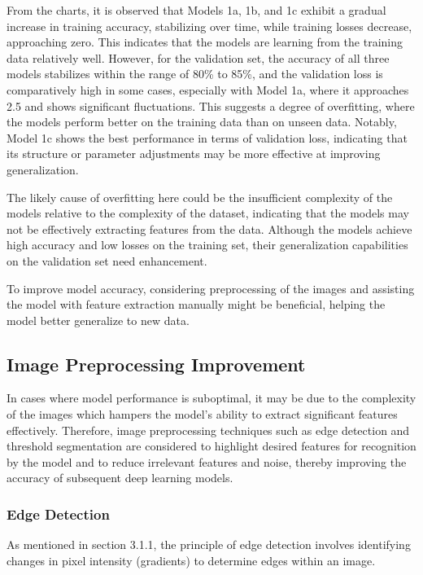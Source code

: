 From the charts, it is observed that Models 1a, 1b, and 1c exhibit a gradual increase in training accuracy, stabilizing over time, while training losses decrease, approaching zero. This indicates that the models are learning from the training data relatively well. However, for the validation set, the accuracy of all three models stabilizes within the range of 80\% to 85\%, and the validation loss is comparatively high in some cases, especially with Model 1a, where it approaches 2.5 and shows significant fluctuations. This suggests a degree of overfitting, where the models perform better on the training data than on unseen data. Notably, Model 1c shows the best performance in terms of validation loss, indicating that its structure or parameter adjustments may be more effective at improving generalization.

The likely cause of overfitting here could be the insufficient complexity of the models relative to the complexity of the dataset, indicating that the models may not be effectively extracting features from the data. Although the models achieve high accuracy and low losses on the training set, their generalization capabilities on the validation set need enhancement.

To improve model accuracy, considering preprocessing of the images and assisting the model with feature extraction manually might be beneficial, helping the model better generalize to new data.

\subsection{Image Preprocessing Improvement}

In cases where model performance is suboptimal, it may be due to the complexity of the images which hampers the model's ability to extract significant features effectively. Therefore, image preprocessing techniques such as edge detection and threshold segmentation are considered to highlight desired features for recognition by the model and to reduce irrelevant features and noise, thereby improving the accuracy of subsequent deep learning models.


\subsubsection{Edge Detection}

As mentioned in section 3.1.1, the principle of edge detection involves identifying changes in pixel intensity (gradients) to determine edges within an image. 


